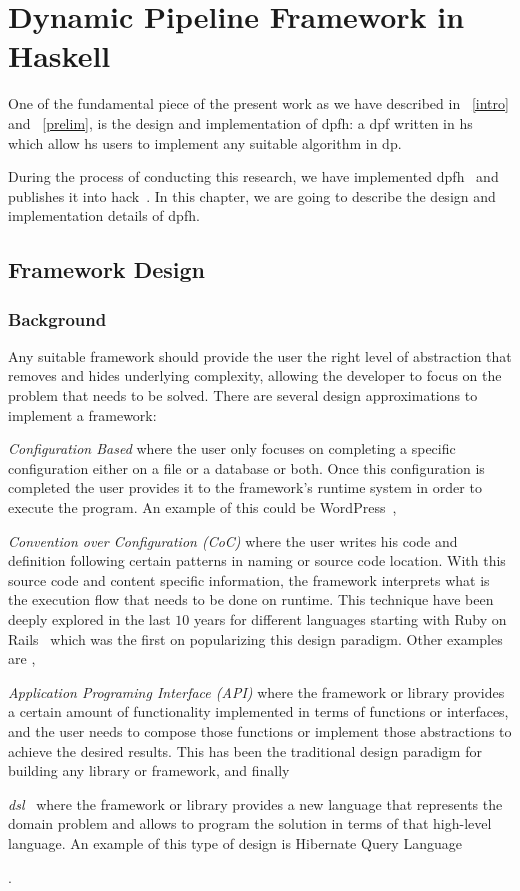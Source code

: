 \chapter{Dynamic Pipeline Framework in Haskell}\label{dp-hs}
One of the fundamental piece of the present work as we have described in ~\autoref{intro} and ~\autoref{prelim},
is the design and implementation of \acrfull{dpfh}: a \acrlong{dpf} written in \acrlong{hs} which allow \acrshort{hs} users
to implement any suitable algorithm in \acrlong{dp}.

During the process of conducting this research, we have implemented \acrshort{dpfh}~\cite{dynamic-pipeline} and publishes it into \acrfull{hack}~\cite{hackage}.
In this chapter, we are going to describe the design and implementation details of \acrshort{dpfh}.

\section{Framework Design}

\subsection{Background}
Any suitable framework should provide the user the right level of abstraction that removes and hides underlying complexity, 
allowing the developer to focus on the problem that needs to be solved.
There are several design approximations to implement a framework: \begin{inparaenum}[i\upshape)]
  \item  \emph{Configuration Based} where the user only focuses on completing a specific configuration either on a file or a database or both. Once this configuration is completed the user provides it to the framework's runtime system in order to execute the program. An example of this could be WordPress~\cite{wordpress},
  \item  \emph{Convention over Configuration (CoC)} where the user writes his code and definition following certain patterns in naming or source code location. With this source code and content specific information, the framework interprets what is the execution flow that needs to be done on runtime. This technique have been deeply explored in the last $10$ years for different languages starting with Ruby on Rails~\cite{rubyonrails} which was the first on popularizing this design paradigm. Other examples are \cite{springboot, cakephp},
  \item \emph{Application Programing Interface (API)} where the framework or library provides a certain amount of functionality implemented in terms of functions or interfaces, and the user needs to compose those functions or implement those abstractions to achieve the desired results. This has been the traditional design paradigm for building any library or framework, and finally
  \item \emph{\acrfull{dsl}}~\cite{Fowler10} where the framework or library provides a new language that represents the domain problem and allows to program the solution in terms of that high-level language. An example of this type of design is Hibernate Query Language~\cite{hql}
   \end{inparaenum}.

